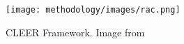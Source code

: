 \begin{figure} [!h]
\centering
\texttt{[image: methodology/images/rac.png]}
\caption[CLEER Framework]{CLEER Framework.  Image from \cite{barroso18}}
\label{img_cleer}
\end{figure}
